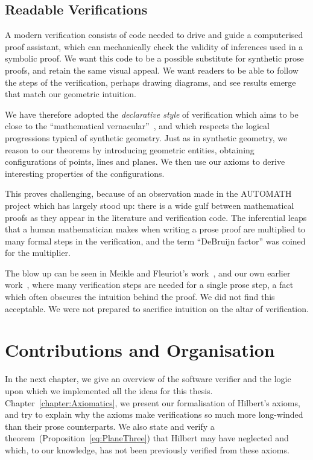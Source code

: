 \subsection{Readable Verifications}
A modern verification consists of code needed to drive and guide a computerised proof assistant, which can mechanically check the validity of inferences used in a symbolic proof. We want this code to be a possible substitute for synthetic prose proofs, and retain the same visual appeal. We want readers to be able to follow the steps of the verification, perhaps drawing diagrams, and see results emerge that match our geometric intuition.

We have therefore adopted the \emph{declarative style} of verification which aims to be close to the ``mathematical vernacular''~\cite{MizarMathematicalVernacular}, and which respects the logical progressions typical of synthetic geometry. Just as in synthetic geometry, we reason to our theorems by introducing geometric entities, obtaining configurations of points, lines and planes. We then use our axioms to derive interesting properties of the configurations.

This proves challenging, because of an observation made in the AUTOMATH project which has largely stood up: there is a wide gulf between mathematical proofs as they appear in the literature and verification code. The inferential leaps that a human mathematician makes when writing a prose proof are multiplied to many formal steps in the verification, and the term ``DeBruijn factor'' was coined for the multiplier. 

The blow up can be seen in Meikle and Fleuriot's work~\cite{MeikleFleuriotFormalizingHilbert}, and our own earlier work~\cite{ScottMScThesis}, where many verification steps are needed for a single prose step, a fact which often obscures the intuition behind the proof. We did not find this acceptable. We were not prepared to sacrifice intuition on the altar of verification.

\section{Contributions and Organisation}
In the next chapter, we give an overview of the software verifier and the logic upon which we implemented all the ideas for this thesis. Chapter~\ref{chapter:Axiomatics}, we present our formalisation of Hilbert's axioms, and try to explain why the axioms make verifications so much more long-winded than their prose counterparts. We also state and verify a theorem~(Proposition~\ref{eq:PlaneThree}) that Hilbert may have neglected and which, to our knowledge, has not been previously verified from these axioms.

